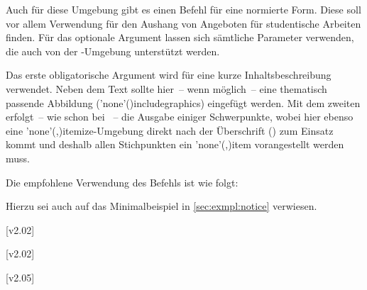 \begin{DeclareEntity}{}
\begin{Declaration}
  {}
\printdeclarationlist

Auch für diese Umgebung gibt es einen Befehl für eine normierte Form. Diese 
soll vor allem Verwendung für den Aushang von Angeboten für studentische 
Arbeiten finden. Für das optionale Argument lassen sich sämtliche Parameter 
verwenden, die auch von der -Umgebung unterstützt werden.

Das erste obligatorische Argument wird für eine kurze Inhaltsbeschreibung 
verwendet. Neben dem Text sollte hier~-- wenn möglich~-- eine thematisch 
passende Abbildung (\Macro'none'(){includegraphics}) 
eingefügt werden. Mit dem zweiten erfolgt~-- wie schon bei ~-- 
die Ausgabe einiger Schwerpunkte, wobei hier ebenso eine 
\Environment'none'(,){itemize}-Umgebung
direkt nach der Überschrift () zum Einsatz kommt und deshalb 
allen Stichpunkten ein \Macro'none'(,){item} 
vorangestellt werden muss.
\end{Declaration}
%
\begin{Example}
Die empfohlene Verwendung des Befehls  ist wie folgt:
\begin{Code}
\end{Code}
Hierzu sei auch auf das Minimalbeispiel in \autoref{sec:exmpl:notice} verwiesen.
\end{Example}

\begin{Declaration}
  {}
  [v2.02]
\begin{Declaration}
  {}
\begin{Declaration}
  {}
  [v2.02]
\begin{Declaration}
  {}
  [v2.05]
\printdeclarationlist


\end{Declaration}
\end{Declaration}
\end{Declaration}
\end{Declaration}
\end{DeclareEntity}
